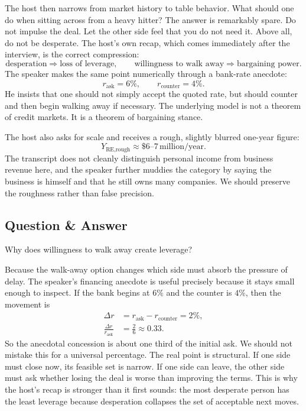 The host then narrows from market history to table behavior. What should one do when sitting across from a heavy hitter? The answer is remarkably spare. Do not impulse the deal. Let the other side feel that you do not need it. Above all, do not be desperate. The host's own recap, which comes immediately after the interview, is the correct compression:
\begin{equation}
\text{desperation} \Rightarrow \text{loss of leverage},
\qquad
\text{willingness to walk away} \Rightarrow \text{bargaining power}.
\end{equation}
The speaker makes the same point numerically through a bank-rate anecdote:
\begin{equation}
r_{\text{ask}} = 6\%,\qquad r_{\text{counter}} = 4\%.
\end{equation}
He insists that one should not simply accept the quoted rate, but should counter and then begin walking away if necessary. The underlying model is not a theorem of credit markets. It is a theorem of bargaining stance.

The host also asks for scale and receives a rough, slightly blurred one-year figure:
\begin{equation}
Y_{\text{RE,rough}} \approx \$6\text{--}7\,\text{million/year}.
\end{equation}
The transcript does not cleanly distinguish personal income from business revenue here, and the speaker further muddies the category by saying the business is himself and that he still owns many companies. We should preserve the roughness rather than false precision.

\subsection{Question \& Answer}

Why does willingness to walk away create leverage?

Because the walk-away option changes which side must absorb the pressure of delay. The speaker's financing anecdote is useful precisely because it stays small enough to inspect. If the bank begins at \(6\%\) and the counter is \(4\%\), then the movement is
\begin{align}
\Delta r &= r_{\text{ask}} - r_{\text{counter}} = 2\%,\\
\frac{\Delta r}{r_{\text{ask}}} &= \frac{2}{6} \approx 0.33.
\end{align}
So the anecdotal concession is about one third of the initial ask. We should not mistake this for a universal percentage. The real point is structural. If one side must close now, its feasible set is narrow. If one side can leave, the other side must ask whether losing the deal is worse than improving the terms. This is why the host's recap is stronger than it first sounds: the most desperate person has the least leverage because desperation collapses the set of acceptable next moves.

